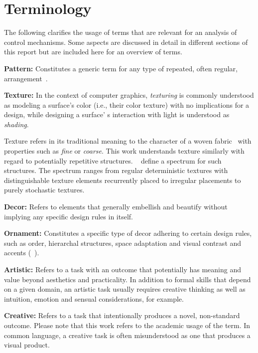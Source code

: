 

\section{Terminology}


The following clarifies the usage of terms that are relevant for an analysis of control mechanisms. Some aspects are discussed in detail in different sections of this report but are included here for an overview of terms.

\textbf{Pattern:} Constitutes a generic term for any type of repeated, often regular, arrangement~\cite{oed_2017}.

\textbf{Texture:} \label{par:taxo_terminology_texture}In the context of computer graphics, \textit{texturing} is commonly understood as modeling a surface's color (i.e., their color texture) with no implications for a design, while designing a surface' s interaction with light is understood as \textit{shading}. 

Texture refers in its traditional meaning to the character of a woven fabric~\cite{oed_2017} with properties such as \textit{fine} or \textit{coarse}. This work understands texture similarly with regard to potentially repetitive structures. \citeauthor*{lin_2006_qeo}~\cite{lin_2006_qeo} define a spectrum for such structures. The spectrum ranges from regular deterministic textures with distinguishable texture elements recurrently placed to irregular placements to purely stochastic textures.

\textbf{Decor:} Refers to elements that generally embellish and beautify without implying any specific design rules in itself.

\textbf{Ornament:} Constitutes a specific type of decor adhering to certain design rules, such as order, hierarchal structures, space adaptation and visual contrast and accents (~).

\textbf{Artistic:} Refers to a task with an outcome that potentially has meaning and value beyond aesthetics and practicality. In addition to formal skills that depend on a given domain, an artistic task usually requires creative thinking as well as intuition, emotion and sensual considerations, for example.

\textbf{Creative:} Refers to a task that intentionally produces a novel, non-standard outcome. Please note that this work refers to the academic usage of the term. In common language, a creative task is often misunderstood as one that produces a visual product.

